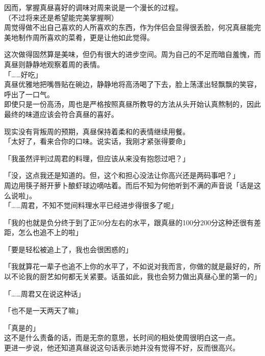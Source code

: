 因而，掌握真昼喜好的调味对周来说是一个漫长的过程。\\

（不过将来还是希望能完美掌握啊）\\

周觉得做不出自己喜欢的人所喜欢的东西，作为伴侣会显得很丢脸，何况真昼能完美地制作周所喜欢的菜肴，更是让他如此觉得。

这次做得固然算是美味，但仍有很大的进步空间。周为自己的不足而暗自羞愧，而真昼则静静地观察着周的表情。\\

「……好吃」\\

真昼优雅地把嘴唇贴在碗边，静静地将高汤喝了下去，脸上荡漾出轻飘飘的笑容，呼出了一口气。\\

即使只是一份高汤，周也是严格按照真昼所教导的方法从头开始认真熬制的，因此最终的味道应该会符合真昼的喜好。

现实没有背叛周的预期，真昼保持着柔和的表情继续用餐。\\

「太好了，看来合你的口味。说实话，我刚才紧张得要命」

「我虽然评判过周君的料理，但应该从来没有抱怨过吧？」

「没，这点我还是知道的。但，这个和担心没法让你高兴还是两码事吧？」\\

周边用筷子掰开萝卜酿虾球边嘀咕着。而后不知为何他听到不满的声音说「话是这么说啦」。\\

「……周君，不知不觉间料理水平已经进步得很多了呢」

「我的也就是负分终于到了正50分左右的水平，跟真昼的100分200分这种还很有差距，怎么也追不上的啦」

「要是轻松被追上了，我也会很困惑的」

「我就算花一辈子也追不上你的水平了，不如说对我而言，你做的就是最好的，所以不论我的厨艺如何都无关紧要。话虽如此，我也会努力做出真昼心里的第一的」

「……周君又在说这种话」

「也不是一天两天了嘛」

「真是的」\\

这不是什么责备的话，而是无奈的意思，长时间的相处使周很明白这一点。\\

更进一步说，他还知道真昼说这句话表示她并没有觉得不好，反而很高兴。\\

